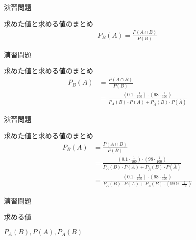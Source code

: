 \documentclass[aspectratio=169, dvipdfmx, 11pt]{beamer}
\begin{document}
\begin{frame}{演習問題}

\begin{alertblock}{求めた値と求める値のまとめ}
\begin{align}
P_B(A)=\frac{P(A\cap B)}{P(B)}
\end{align}
\end{alertblock}

\end{frame}


\begin{frame}{演習問題}

\begin{alertblock}{求めた値と求める値のまとめ}
\begin{align}
P_B(A)&=\frac{P(A\cap B)}{P(B)}\\
&=\frac{(0.1\cdot \frac{1}{100})\cdot (98\cdot \frac{1}{100})}{P_A(B)\cdot P(A)+P_{\overline{A}}(B)\cdot P(\overline{A})}
\end{align}
\end{alertblock}

\end{frame}


\begin{frame}{演習問題}

\begin{alertblock}{求めた値と求める値のまとめ}
\begin{align}
P_B(A)&=\frac{P(A\cap B)}{P(B)}\\
&=\frac{(0.1\cdot \frac{1}{100})\cdot (98\cdot \frac{1}{100})}{P_A(B)\cdot P(A)+P_{\overline{A}}(B)\cdot P(\overline{A})}\\
&=\frac{(0.1\cdot \frac{1}{100})\cdot (98\cdot \frac{1}{100})}{P_A(B)\cdot P(A)+P_{\overline{A}}(B)\cdot (99.9\cdot \frac{1}{100})}
\end{align}
\end{alertblock}

\end{frame}


\begin{frame}{演習問題}

\begin{alertblock}{求める値}
\begin{center}
$P_A(B), P(A), P_{\overline{A}}(B)$
\end{center}
\end{alertblock}

\end{frame}
\end{document}

